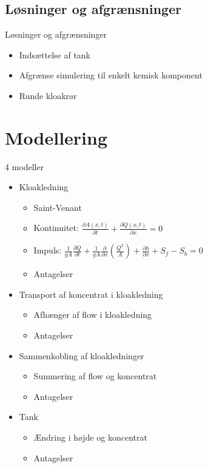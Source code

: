 \subsection{Løsninger og afgrænsninger}
\begin{frame}{Løsninger og afgrænsninger}{}
\vfill\vfill\centering
\begin{itemize}
	\item<1-> Indsættelse af tank
	\vspace{4mm}
	\item<2-> Afgrænse simulering til enkelt kemisk komponent
	\vspace{4mm}
	\item<3-> Runde kloakrør
\end{itemize}
\vfill\vfill	
\end{frame}

\section{Modellering}

\begin{frame}{4 modeller}{}
	\vfill\vfill\centering
\begin{itemize}
	\item<1-> Kloakledning
	\begin{itemize}
		\item<2-> Saint-Venant
		\item<2-> Kontinuitet: \hspace{15mm} $\frac{\partial A(x,t)}{\partial t} + \frac{\partial Q(x,t)}{\partial x}=0$ 
		\item<2-> Impuls: \hspace{21mm} $\frac{1}{gA} \frac{\partial Q}{\partial t} +\frac{1}{gA}\frac{\partial}{\partial x} \left( \frac{Q^2}{A} \right) + \frac{\partial h}{\partial x} + S_f - S_b = 0$
		\item<2-> Antagelser
	\end{itemize}
	\vspace{4mm}
	\item<1-> Transport af koncentrat i kloakledning
	\begin{itemize}
		\item<3-> Afhænger af flow i kloakledning
		\item<3-> Antagelser
	\end{itemize}
	\vspace{4mm}
	\item<1-> Sammenkobling af kloakledninger
	\begin{itemize}
		\item<4-> Summering af flow og koncentrat
		\item<4-> Antagelser
	\end{itemize}
	\vspace{4mm}
	\item<1-> Tank
	\begin{itemize}
		\item<5-> Ændring i højde og koncentrat
		\item<5-> Antagelser
	\end{itemize}	 
\end{itemize}
\vfill\vfill		
\end{frame}

